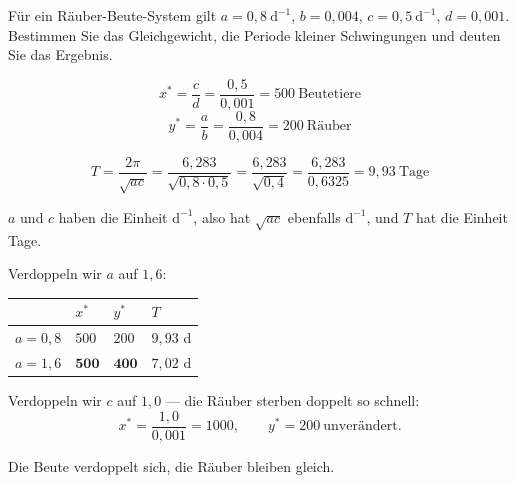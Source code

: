 \begin{aufgabe}
Für ein Räuber-Beute-System gilt $a = 0{,}8\ \mathrm{d}^{-1}$, $b = 0{,}004$, $c = 0{,}5\ \mathrm{d}^{-1}$, $d = 0{,}001$. Bestimmen Sie das Gleichgewicht, die Periode kleiner Schwingungen und deuten Sie das Ergebnis.

\loesung
{}
\[ x^{*} = \frac{c}{d} = \frac{0{,}5}{0{,}001} = 500 \ \text{Beutetiere} \]
\[ y^{*} = \frac{a}{b} = \frac{0{,}8}{0{,}004} = 200 \ \text{Räuber} \]

\[ T = \frac{2\pi}{\sqrt{ac}} = \frac{6{,}283}{\sqrt{0{,}8 \cdot 0{,}5}} = \frac{6{,}283}{\sqrt{0{,}4}} = \frac{6{,}283}{0{,}6325} = 9{,}93\ \text{Tage} \]

$a$ und $c$ haben die Einheit $\mathrm{d}^{-1}$, also hat $\sqrt{ac}$ ebenfalls $\mathrm{d}^{-1}$, und $T$ hat die Einheit Tage. \checkmark

Verdoppeln wir $a$ auf $1{,}6$:
\begin{center}
\renewcommand{\arraystretch}{1.48}
\begin{tabular}{@{}P{2.4cm}P{2.0cm}P{2.0cm}P{1.8cm}@{}}
\toprule
& $x^{*}$ & $y^{*}$ & $T$\\
\midrule
$a = 0{,}8$ & $500$ & $200$ & $9{,}93$ d\\
$a = 1{,}6$ & $\mathbf{500}$ & $\mathbf{400}$ & $7{,}02$ d\\
\bottomrule
\end{tabular}
\end{center}

\begin{center}
\begin{minipage}{0.88\textwidth}
\end{minipage}
\end{center}

Verdoppeln wir $c$ auf $1{,}0$ --- die Räuber sterben doppelt so schnell:
\[ x^{*} = \frac{1{,}0}{0{,}001} = 1000, \qquad y^{*} = 200 \ \text{unverändert} . \]

Die Beute verdoppelt sich, die Räuber bleiben gleich.

\begin{center}
\begin{minipage}{0.86\textwidth}
\end{minipage}
\end{center}
\end{aufgabe}

